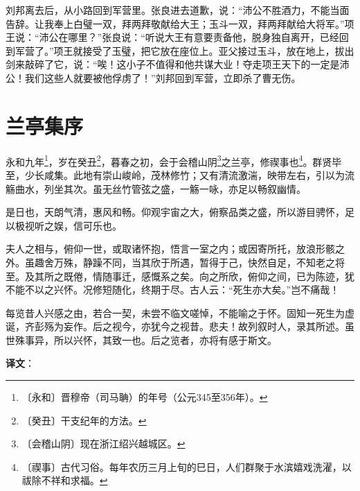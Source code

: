 \documentclass[12pt,UTF-8,openany]{ctexbook}
\begin{document}
\begin{normalsize}
    刘邦离去后，从小路回到军营里。张良进去道歉，说：“沛公不胜酒力，不能当面告辞。让我奉上白璧一双，拜两拜敬献给大王；玉斗一双，拜两拜献给大将军。”项王说：“沛公在哪里？”张良说：“听说大王有意要责备他，脱身独自离开，已经回到军营了。”项王就接受了玉璧，把它放在座位上。亚父接过玉斗，放在地上，拔出剑来敲碎了它，说：“唉！这小子不值得和他共谋大业！夺走项王天下的一定是沛公！我们这些人就要被他俘虏了！”刘邦回到军营，立即杀了曹无伤。
    
\end{normalsize}



\chapter{兰亭集序}

\begin{normalsize}
    
    永和九年\footnote{〔永和〕晋穆帝（司马聃）的年号（公元345至356年）。}，岁在癸丑\footnote{〔癸丑〕干支纪年的方法。}，暮春之初，会于会稽山阴\footnote{〔会稽山阴〕现在浙江绍兴越城区。}之兰亭，修禊事也\footnote{〔禊事〕古代习俗。每年农历三月上旬的巳日，人们群聚于水滨嬉戏洗濯，以祓除不祥和求福。}。群贤毕至，少长咸集。此地有崇山峻岭，茂林修竹；又有清流激湍，映带左右，引以为流觞曲水，列坐其次。虽无丝竹管弦之盛，一觞一咏，亦足以畅叙幽情。
    
    是日也，天朗气清，惠风和畅。仰观宇宙之大，俯察品类之盛，所以游目骋怀，足以极视听之娱，信可乐也。
    
    夫人之相与，俯仰一世，或取诸怀抱，悟言一室之内；或因寄所托，放浪形骸之外。虽趣舍万殊，静躁不同，当其欣于所遇，暂得于己，快然自足，不知老之将至。及其所之既倦，情随事迁，感慨系之矣。向之所欣，俯仰之间，已为陈迹，犹不能不以之兴怀。况修短随化，终期于尽。古人云：“死生亦大矣。”岂不痛哉！
    
    每览昔人兴感之由，若合一契，未尝不临文嗟悼，不能喻之于怀。固知一死生为虚诞，齐彭殇为妄作。后之视今，亦犹今之视昔。悲夫！故列叙时人，录其所述。虽世殊事异，所以兴怀，其致一也。后之览者，亦将有感于斯文。
\end{normalsize}


\newpage

\textbf{译文}：

\vspace{1em}
\end{document}
